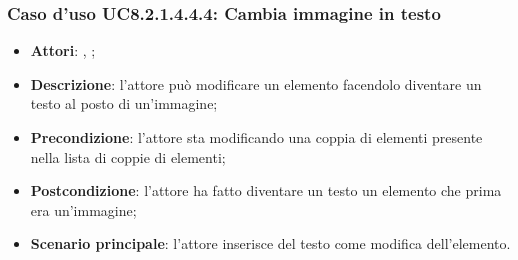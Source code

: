 		\subsubsection{Caso d'uso UC8.2.1.4.4.4: Cambia immagine in testo}
		\label{UC8.2.1.4.4.4}
		\begin{itemize}
			\item \textbf{Attori}: \uau, \uaupro;
			\item \textbf{Descrizione}: l'attore può modificare un elemento facendolo diventare un testo al posto di un'immagine;
			\item \textbf{Precondizione}: l'attore sta modificando una coppia di elementi presente nella lista di coppie di elementi; 
			\item \textbf{Postcondizione}: l'attore ha fatto diventare un testo un elemento che prima era un'immagine;
			\item \textbf{Scenario principale}: l'attore inserisce del testo come modifica dell'elemento.  
		\end{itemize}